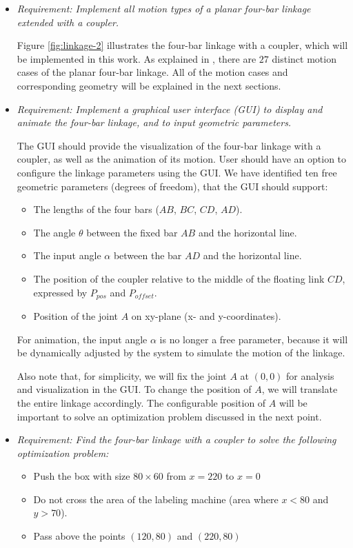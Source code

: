 \documentclass{article}
\begin{document}
\begin{itemize}
	\item \textit{Requirement: Implement all motion types of a planar four-bar linkage extended with a coupler.}
	
	Figure \ref{fig:linkage-2} illustrates the four-bar linkage with a coupler, which will be implemented in this work. As explained in \cite{inproceedings}, there are $27$ distinct motion cases of the planar four-bar linkage. All of the motion cases and corresponding geometry will be explained in the next sections.
	
	\item \textit{Requirement: Implement a graphical user interface (GUI) to display and animate the four-bar linkage, and to input geometric parameters.}
	
	The GUI should provide the visualization of the four-bar linkage with a coupler, as well as the animation of its motion. User should have an option to configure the linkage parameters using the GUI. We have identified ten free geometric parameters (degrees of freedom), that the GUI should support:
	
	\begin{itemize}
		\item The lengths of the four bars ($AB$, $BC$, $CD$, $AD$).
		\item The angle $\theta$ between the fixed bar $AB$ and the horizontal line.
		\item The input angle $\alpha$ between the bar $AD$ and the horizontal line.
		\item The position of the coupler relative to the middle of the floating link $CD$, expressed by $P_{pos}$ and $P_{offset}$.
		\item Position of the joint $A$ on xy-plane (x- and y-coordinates).
	\end{itemize}
	
	For animation, the input angle $\alpha$ is no longer a free parameter, because it will be dynamically adjusted by the system to simulate the motion of the linkage.
	
	Also note that, for simplicity, we will fix the joint $A$ at $(0, 0)$ for analysis and visualization in the GUI. To change the position of $A$, we will translate the entire linkage accordingly. The configurable position of $A$ will be important to solve an optimization problem discussed in the next point.
	
	\item \textit{Requirement: Find the four-bar linkage with a coupler to solve the following optimization problem:}
	\begin{itemize}
		\item Push the box with size $80\times60$ from $x=220$ to $x=0$
		\item Do not cross the area of the labeling machine (area where $x<80$ and $y>70$).
		\item Pass above the points $(120, 80)$ and $(220, 80)$
	\end{itemize}
	

\end{itemize}
\end{document}
